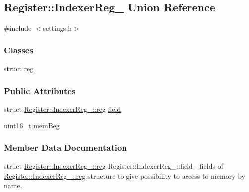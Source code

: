 \hypertarget{unionRegister_1_1IndexerReg__}{}\subsection{Register\+:\+:Indexer\+Reg\+\_\+ Union Reference}
\label{unionRegister_1_1IndexerReg__}


{\ttfamily \#include $<$settings.\+h$>$}

\subsubsection*{Classes}
\begin{DoxyCompactItemize}
\item 
struct \mbox{\hyperlink{structRegister_1_1IndexerReg___1_1reg}{reg}}
\end{DoxyCompactItemize}
\subsubsection*{Public Attributes}
\begin{DoxyCompactItemize}
\item 
struct \mbox{\hyperlink{structRegister_1_1IndexerReg___1_1reg}{Register\+::\+Indexer\+Reg\+\_\+\+::reg}} \mbox{\hyperlink{unionRegister_1_1IndexerReg___a21a03f333ef5c8e16708cf38d22d5abb}{field}}
\item 
\mbox{\hyperlink{settings_8h_a017dd44e68049ffdd31500a8cd01ba68}{uint16\+\_\+t}} \mbox{\hyperlink{unionRegister_1_1IndexerReg___ab61397dfa5cf6bbc29d9642c3875967f}{mem\+Beg}}
\end{DoxyCompactItemize}


\subsubsection{Member Data Documentation}
\mbox{\label{unionRegister_1_1IndexerReg___a21a03f333ef5c8e16708cf38d22d5abb}} 
{\footnotesize\ttfamily struct \mbox{\hyperlink{structRegister_1_1IndexerReg___1_1reg}{Register\+::\+Indexer\+Reg\+\_\+\+::reg}} Register\+::\+Indexer\+Reg\+\_\+\+::\texorpdfstring{field}{field}} - fields of \hyperlink{structRegister_1_1IndexerReg___1_1reg}{Register\+::\+Indexer\+Reg\+\_\+\+::reg} structure to give possibility to access to memory by name.


